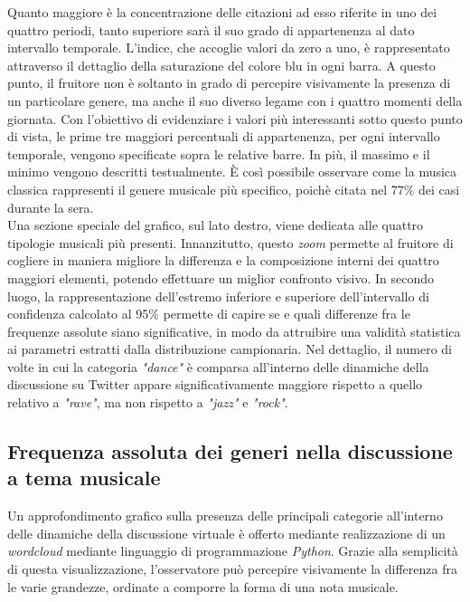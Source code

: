\documentclass[12pt, a4paper, twocolumn]{article} %
\begin{document}
Quanto maggiore è la concentrazione delle citazioni ad esso riferite in uno dei quattro periodi, tanto superiore sarà il suo grado di appartenenza al dato intervallo temporale. 
L'indice, che accoglie valori da zero a uno, è rappresentato attraverso il dettaglio della saturazione del colore blu in ogni barra. A questo punto, il fruitore non è soltanto in grado di percepire visivamente la presenza di un particolare genere, ma anche il suo diverso legame con i quattro momenti della giornata. 
Con l'obiettivo di evidenziare i valori più interessanti sotto questo punto di vista, le prime tre maggiori percentuali di appartenenza, per ogni intervallo temporale, vengono specificate sopra le relative barre. 
In più, il massimo e il minimo vengono descritti testualmente. È così possibile osservare come la musica classica rappresenti il genere musicale più specifico, poichè citata nel 77\% dei casi durante la sera.\\
Una sezione speciale del grafico, sul lato destro, viene dedicata alle quattro tipologie musicali più presenti. 
Innanzitutto, questo \textit{zoom} permette al fruitore di cogliere in maniera migliore la differenza e la composizione interni dei quattro maggiori elementi, potendo effettuare un miglior confronto visivo. 
In secondo luogo, la rappresentazione dell'estremo inferiore e superiore dell'intervallo di confidenza calcolato al 95\% permette di capire se e quali differenze fra le frequenze assolute siano significative, in modo da attruibire una validità statistica ai parametri estratti dalla distribuzione campionaria. 
Nel dettaglio, il numero di volte in cui la categoria \textit{"dance"} è comparsa all'interno delle dinamiche della discussione su Twitter appare significativamente maggiore rispetto a quello relativo a \textit{"rave"}, ma non rispetto a \textit{"jazz"} e \textit{"rock"}. 

\subsection{Frequenza assoluta dei generi nella discussione a tema musicale}
Un approfondimento grafico sulla presenza delle principali categorie all'interno delle dinamiche della discussione virtuale è offerto mediante realizzazione di un \textit{wordcloud} mediante linguaggio di programmazione \textit{Python}. 
Grazie alla semplicità di questa visualizzazione, l'osservatore può percepire visivamente la differenza fra le varie grandezze, ordinate a comporre la forma di una nota musicale. 
\end{document}
